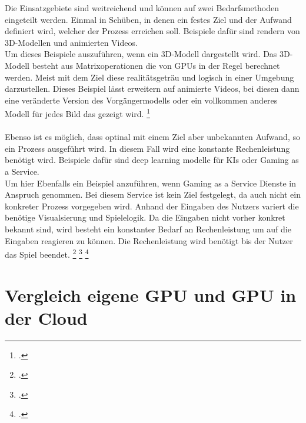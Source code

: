 \documentclass[12pt,toc=bib,toc=listof]{scrreprt}
\begin{document}
Die Einsatzgebiete sind weitreichend und können auf zwei Bedarfsmethoden eingeteilt werden.
Einmal in Schüben, in denen ein festes Ziel und der Aufwand definiert wird, welcher der Prozess erreichen soll.
Beispiele dafür sind rendern von 3D-Modellen und animierten Videos.
\\ 
Um dieses Beispiele auszuführen, wenn ein 3D-Modell dargestellt wird. Das 3D-Modell besteht aus Matrixoperationen die von GPUs 
in der Regel berechnet werden. Meist mit dem Ziel diese realitätsgeträu und logisch in einer Umgebung darzustellen.
Dieses Beispiel lässt erweitern auf animierte Videos, bei diesen dann eine veränderte Version des Vorgängermodells oder ein 
vollkommen anderes Modell für jedes Bild das gezeigt wird. \footcite [Vgl.] [] {Loop.2006}
\\ \\
Ebenso ist es möglich, dass optinal mit einem Ziel aber unbekannten Aufwand, so ein Prozess ausgeführt wird. 
In diesem Fall wird eine konstante Rechenleistung benötigt wird.
Beispiele dafür sind deep learning modelle für KIs oder Gaming as a Service.
\\
Um hier Ebenfalls ein Beispiel anzuführen, wenn Gaming as a Service Dienste in Anspruch genommen.
Bei diesem Service ist kein Ziel festgelegt, da auch nicht ein konkreter Prozess vorgegeben wird.
Anhand der Eingaben des Nutzers variert die benötige Visualsierung und Spielelogik. Da die Eingaben 
nicht vorher konkret bekannt sind, wird besteht ein konstanter Bedarf an Rechenleistung um auf die Eingaben 
reagieren zu können. Die Rechenleistung wird benötigt bis der Nutzer das Spiel beendet. \footcite [Vgl.] [] {Lattuada.2022} \footcite [Vgl.] [] {Wang.2017} \footcite [Vgl.] [] {Loop.2006}

\section{Vergleich eigene GPU und GPU in der Cloud}
\label{sec:Vergleich eigene GPU und GPU in der Cloud}
\end{document}
